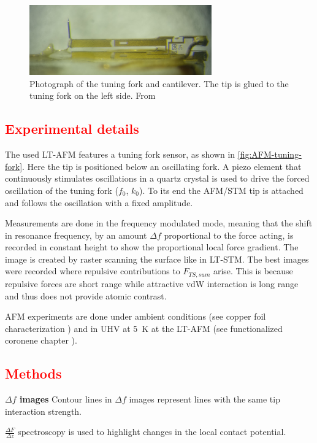 \begin{figure}\centering
	\includegraphics[width=0.7\textwidth]{./images/AFM-qplus-photograph}
	\caption{Photograph of the tuning fork and cantilever. The tip is glued to the tuning fork on the left side. From \cite{he_bottom-up_2017}}
	\label{fig:AFM-tuning-fork}
\end{figure}

\subsection{\textcolor{red}{\textbf{Experimental details}}}
The used LT-AFM features a tuning fork sensor, as shown in \autoref{fig:AFM-tuning-fork}. Here the tip is positioned below an oscillating fork.  A piezo element that continuously stimulates oscillations in a quartz crystal is used to drive the forced oscillation of the tuning fork ($f_0$, $k_0$). To its end the AFM/STM tip is attached and follows the oscillation with a fixed amplitude.

Measurements are done in the frequency modulated mode, meaning that the shift in resonance frequency, by an amount $\Delta f$  proportional to the force acting, is recorded in constant height to show the proportional local force gradient. The image is created by raster scanning the surface like in LT-STM. The best images were recorded where repulsive contributions to $F_{TS,sum}$ arise. This is because repulsive forces are short range while attractive vdW interaction is long range and thus does not provide atomic contrast.

AFM experiments are done under ambient conditions (see copper foil characterization \pageref{fig:foil-afm-as-bought}) and in UHV at \SI{5}{\kelvin} at the LT-AFM (see functionalized coronene chapter \pageref{section:HBBNC}).

\subsection{\textcolor{red}{\textbf{Methods}}}
\textbf{$\Delta f $ images} 
Contour lines in $\Delta f$ images represent lines with the same tip interaction strength.

\textbf{$\frac{\Delta F}{\Delta z}$} spectroscopy is used to highlight changes in the local contact potential.